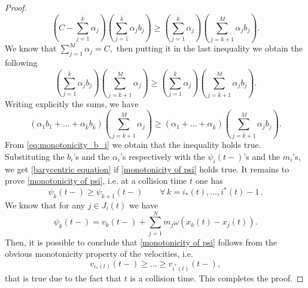 \documentclass[11pt,a4paper,oneside]{amsart}
\begin{document}
\begin{proof}
    \begin{equation*}
        \left(C-\sum_{j=1}^{\bar k}\alpha_j\right)\left(\sum_{j=1}^{\bar k}\alpha_jb_j \right)\geq 
        \left(\sum_{j=1}^{\bar k}\alpha_j\right)\left(\sum_{j=\bar k+1}^M\alpha_jb_j\right).
    \end{equation*}
    We know that $\sum_{j=1}^M\alpha_j=C,$ then putting it in the last inequality we obtain the following
    \begin{equation*}
        \left(\sum_{j=1}^{\bar k}\alpha_jb_j\right)\left(\sum_{j=\bar k+1}^M\alpha_j\right)
        \geq\left(\sum_{j=1}^{\bar k}\alpha_j\right)\left(\sum_{j=\bar k+1}^M\alpha_jb_j\right).
    \end{equation*}
    Writing explicitly the sums, we have
    \begin{equation*}
        \left(\alpha_1b_1+\dots+\alpha_{\bar k}b_{\bar k}\right)\left(\sum_{j=\bar k+1}^M\alpha_j\right)
        \geq\left(\alpha_1+\dots+\alpha_{\bar k}\right)\left(\sum_{j=\bar k+1}^M\alpha_jb_j\right).
    \end{equation*}
    From \eqref{eq:monotonicity_b_i}  we obtain that the inequality holds true. 
    Substituting the $b_i$'s and the $\alpha_i$'s respectively with the $\psi_i(t-)$'s and the $m_i$'s, 
    we get \eqref{barycentric equation} if \eqref{monotonicity of psi} holds true.
    \newline
    It remains to prove \eqref{monotonicity of psi}, i.e. at a collision time $t$ one has
 \begin{equation*}
        \psi_{k}(t-)\geq\psi_{k+1}(t-)\qquad \forall\, k = i_*(t), \ldots, i^*(t)-1\,.
    \end{equation*}
    We know that for any $j\in J_i(t)$ we have
    $$
    \psi_k(t-)=v_k(t-)+\sum_{j=1}^N m_j\omega(x_k(t)-x_j(t)).
    $$
    Then, it is possible to conclude that \eqref{monotonicity of psi} follows 
    from the obvious monotonicity property of the velocities, i.e.
    \begin{equation*}
        v_{i_*(t)}(t-)\geq\dots\geq v_{i^*(t)}(t-),
    \end{equation*}
   that is true due to the fact that $t$ is a collision time. This completes the proof.
\end{proof}
\end{document}
